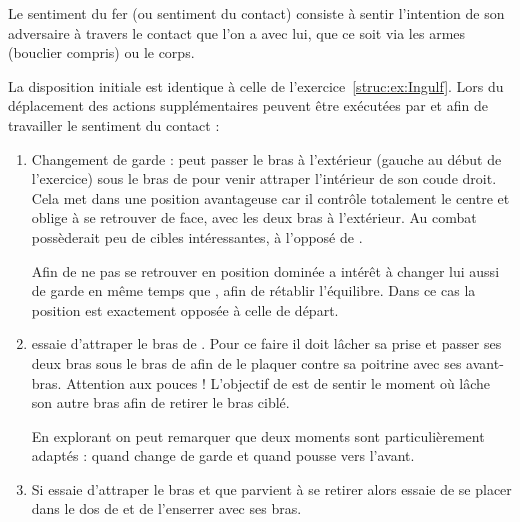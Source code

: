 \begin{definition}
\label{conc:def:sentiment-fer}

Le sentiment du fer (ou sentiment du contact) consiste à sentir l'intention de son adversaire à travers le contact que l'on a avec lui, que ce soit via les armes (bouclier compris) ou le corps.
\end{definition}


\begin{exercice}
\label{att:ex:Ingulf-variantes}


La disposition initiale est identique à celle de l'exercice~\ref{struc:ex:Ingulf}.
Lors du déplacement des actions supplémentaires peuvent être exécutées par \A et \D afin de travailler le sentiment du contact :
\begin{enumerate}
	\item Changement de garde : \A peut passer le bras à l'extérieur (gauche au début de l'exercice) sous le bras de \D pour venir attraper l'intérieur de son coude droit.
	Cela met \A dans une position avantageuse car il contrôle totalement le centre et oblige \D à se retrouver de face, avec les deux bras à l'extérieur.
	Au combat \D possèderait peu de cibles intéressantes, à l'opposé de \A.
	
	Afin de ne pas se retrouver en position dominée \D a intérêt à changer lui aussi de garde en même temps que \A, afin de rétablir l'équilibre.
	Dans ce cas la position est exactement opposée à celle de départ.
	
	\item \A essaie d'attraper le bras de \D.
	Pour ce faire il doit lâcher sa prise et passer ses deux bras sous le bras de \D afin de le plaquer contre sa poitrine avec ses avant-bras.
	Attention aux pouces !
	L'objectif de \D est de sentir le moment où \A lâche son autre bras afin de retirer le bras ciblé.
	
	En explorant on peut remarquer que deux moments sont particulièrement adaptés : quand \D change de garde et quand \D pousse vers l'avant.
	
	\item Si \A essaie d'attraper le bras et que \D parvient à se retirer alors \D essaie de se placer dans le dos de \A et de l'enserrer avec ses bras.
	

\end{enumerate}
\end{exercice}
